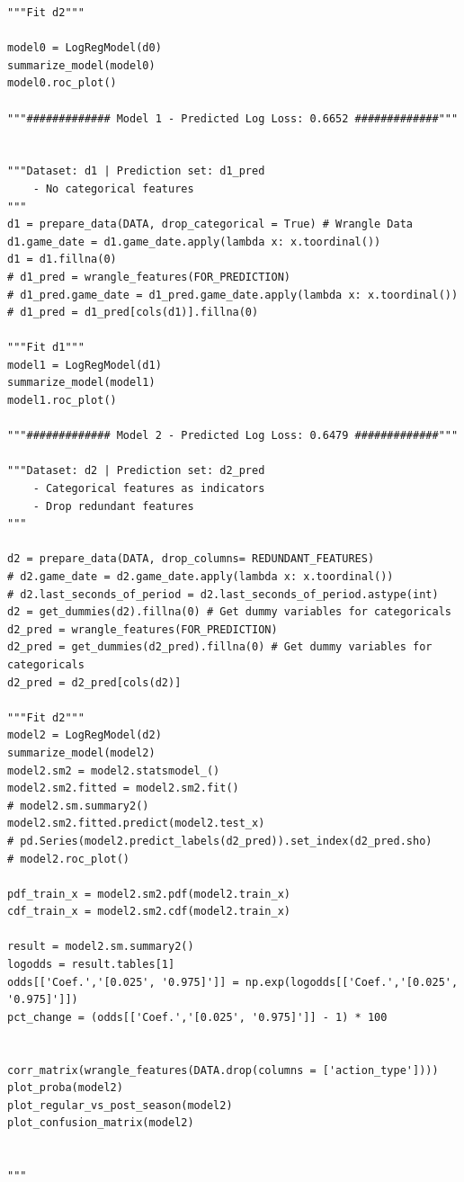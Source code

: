 \begin{verbatim}
"""Fit d2"""

model0 = LogRegModel(d0)
summarize_model(model0)
model0.roc_plot()

"""############# Model 1 - Predicted Log Loss: 0.6652 #############"""


"""Dataset: d1 | Prediction set: d1_pred
    - No categorical features
"""
d1 = prepare_data(DATA, drop_categorical = True) # Wrangle Data
d1.game_date = d1.game_date.apply(lambda x: x.toordinal())
d1 = d1.fillna(0)
# d1_pred = wrangle_features(FOR_PREDICTION)
# d1_pred.game_date = d1_pred.game_date.apply(lambda x: x.toordinal())
# d1_pred = d1_pred[cols(d1)].fillna(0)

"""Fit d1"""
model1 = LogRegModel(d1)
summarize_model(model1)
model1.roc_plot()

"""############# Model 2 - Predicted Log Loss: 0.6479 #############"""

"""Dataset: d2 | Prediction set: d2_pred
    - Categorical features as indicators
    - Drop redundant features
"""

d2 = prepare_data(DATA, drop_columns= REDUNDANT_FEATURES)
# d2.game_date = d2.game_date.apply(lambda x: x.toordinal())
# d2.last_seconds_of_period = d2.last_seconds_of_period.astype(int)
d2 = get_dummies(d2).fillna(0) # Get dummy variables for categoricals
d2_pred = wrangle_features(FOR_PREDICTION)
d2_pred = get_dummies(d2_pred).fillna(0) # Get dummy variables for categoricals
d2_pred = d2_pred[cols(d2)]

"""Fit d2"""
model2 = LogRegModel(d2)
summarize_model(model2)
model2.sm2 = model2.statsmodel_()
model2.sm2.fitted = model2.sm2.fit()
# model2.sm.summary2()
model2.sm2.fitted.predict(model2.test_x)
# pd.Series(model2.predict_labels(d2_pred)).set_index(d2_pred.sho)
# model2.roc_plot()

pdf_train_x = model2.sm2.pdf(model2.train_x)
cdf_train_x = model2.sm2.cdf(model2.train_x)

result = model2.sm.summary2()
logodds = result.tables[1]
odds[['Coef.','[0.025', '0.975]']] = np.exp(logodds[['Coef.','[0.025', '0.975]']])
pct_change = (odds[['Coef.','[0.025', '0.975]']] - 1) * 100


corr_matrix(wrangle_features(DATA.drop(columns = ['action_type'])))
plot_proba(model2)
plot_regular_vs_post_season(model2)
plot_confusion_matrix(model2)


"""


\end{verbatim}
